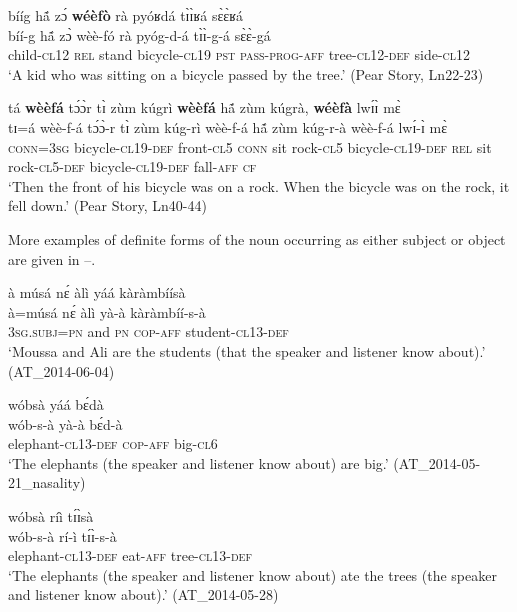 \documentclass[output=paper]{langsci/langscibook}
\begin{document}
\ea\label{ex:teo:40}
\glll bííg h\'{ã} z\'ɔ \textbf{wéèfò} rà pyóʁdá t\`ɪ\`ɪʁá s\`ɛ\`ɛʁá\\
 bíí-g h\'{ã} z\`ɔ wèè-fó rà pyóg-d-á t\`ɪ\`ɪ-g-á s\`ɛ\`ɛ-gá\\
child-\textsc{cl}12 \textsc{rel} stand bicycle-\textsc{cl}19 \textsc{pst} \textsc{pass-prog-aff} tree-\textsc{cl12-def} side-\textsc{cl12}\\
\glt ‘A kid who was sitting on a bicycle passed by the tree.’ (Pear Story, Ln22-23)
\z

\ea\label{ex:teo:41}
\glll tá \textbf{wèèfá} t\'ɔ\`ɔr t\`ɪ zùm kúgrì \textbf{wèèfá} h\'{ã} zùm kúgrà, \textbf{wéèfà} lw\'ɪ\`ɪ m\`ɛ \\
 tɪ=á wèè-f-á t\'ɔ\`ɔ-r t\`ɪ zùm kúg-rì wèè-f-á h\'{ã} zùm kúg-r-à wèè-f-á lw\'ɪ-\`ɪ m\`ɛ\\
 \textsc{conn}=3\textsc{sg} bicycle-\textsc{cl19}-\textsc{def} front-\textsc{cl}5 \textsc{conn} sit rock-\textsc{cl}5 bicycle-\textsc{cl19}-\textsc{def} \textsc{rel} sit rock-\textsc{cl}5-\textsc{def} bicycle-\textsc{cl}19-\textsc{def} fall-\textsc{aff} \textsc{cf}\\
\glt ‘Then the front of his bicycle was on a rock. When the bicycle was on the rock, it fell down.’ (Pear Story, Ln40-44)
\z

More examples of definite forms of the noun occurring as either subject or object are given in –.

\ea\label{ex:teo:42}
\glll à músá n\'ɛ àlì yáá kàràmbíísà\\
 à=músá n\'ɛ àlì yà-à kàràmbíí-s-à \\
\textsc{3sg.subj=pn} and \textsc{pn} \textsc{cop-aff} student-\textsc{cl13-def} \\
\glt ‘Moussa and Ali are the students (that the speaker and listener know about).’ (AT\_2014-06-04)
\z

\ea\label{ex:teo:43}
\glll wóbsà yáá b\'ɛdà\\
 wób-s-à yà-à b\'ɛd-à\\
elephant-\textsc{cl13-def} \textsc{cop-aff} big-\textsc{cl6}\\
\glt ‘The elephants (the speaker and listener know about) are big.’ (AT\_2014-05-21\_nasality)
\z

\ea\label{ex:teo:44}
\glll wóbsà ríì t\'ɪ\`ɪsà\\
 wób-s-à rí-ì t\'ɪ\`ɪ-s-à\\
elephant-\textsc{cl13-def} eat-\textsc{aff} tree-\textsc{cl13-def}\\
\glt ‘The elephants (the speaker and listener know about) ate the trees (the speaker and listener know about).’ (AT\_2014-05-28)
\z
\end{document}
